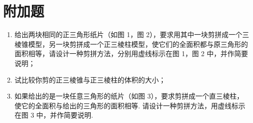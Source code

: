 \section{附加题}
\begin{problem}
\begin{enumerate}
\item 给出两块相同的正三角形纸片（如图 1，图 2），要求用其中一块剪拼成一个三棱锥模型，另一块剪拼成一个正三棱柱模型，使它们的全面积都与原三角形的面积相等，请设计一种剪拼方法，分别用虚线标示在图 1，图 2 中，并作简要说明；
\item 试比较你剪的正三棱锥与正三棱柱的体积的大小；
\item 如果给出的是一块任意三角形的纸片（如图 3），要求剪拼成一个直三棱柱，使它的全面积与给出的三角形的面积相等. 请设计一种剪拼方法，用虚线标示在图 3 中，并作简要说明.
\end{enumerate}

\end{problem}

